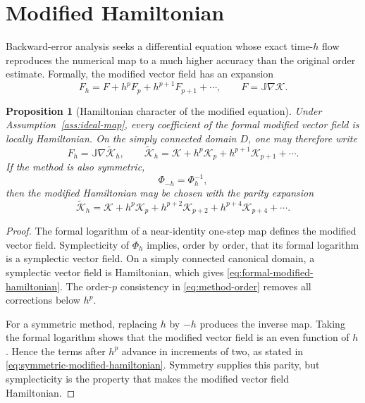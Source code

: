 \documentclass[11pt,a4paper]{article}
\newtheorem{proposition}[theorem]{Proposition}
\theoremstyle{definition}
\theoremstyle{remark}
\newcommand{\J}{\mathbb{J}}
\newcommand{\K}{\mathcal{K}}
\newcommand{\Kh}{\widetilde{\mathcal{K}}_h}
\newcommand{\PhiNum}{\Phi_h}
\begin{document}
\section{Modified Hamiltonian}

Backward-error analysis seeks a differential equation whose exact time-$h$
flow reproduces the numerical map to a much higher accuracy than the original
order estimate.  Formally, the modified vector field has an expansion
\begin{equation}
 F_h=F+h^pF_p+h^{p+1}F_{p+1}+\cdots,
 \qquad
 F=\J\nabla\K.
 \label{eq:formal-modified-vector-field}
\end{equation}

\begin{proposition}[Hamiltonian character of the modified equation]
\label{prop:modified-hamiltonian}
Under Assumption~\ref{ass:ideal-map}, every coefficient of the formal modified
vector field is locally Hamiltonian.  On the simply connected domain $D$, one
may therefore write
\begin{equation}
 F_h=\J\nabla\Kh,
 \qquad
 \Kh
 =\K+h^p\K_p+h^{p+1}\K_{p+1}+\cdots.
 \label{eq:formal-modified-hamiltonian}
\end{equation}
If the method is also symmetric,
\begin{equation}
 \Phi_{-h}=\PhiNum^{-1},
 \label{eq:symmetry-condition}
\end{equation}
then the modified Hamiltonian may be chosen with the parity expansion
\begin{equation}
 \Kh=\K+h^p\K_p+h^{p+2}\K_{p+2}+h^{p+4}\K_{p+4}+\cdots.
 \label{eq:symmetric-modified-hamiltonian}
\end{equation}
\end{proposition}

\begin{proof}
The formal logarithm of a near-identity one-step map defines the modified
vector field.  Symplecticity of $\PhiNum$ implies, order by order, that its
formal logarithm is a symplectic vector field.  On a simply connected canonical
domain, a symplectic vector field is Hamiltonian, which gives
\eqref{eq:formal-modified-hamiltonian}.  The order-$p$ consistency in
\eqref{eq:method-order} removes all corrections below $h^p$.

For a symmetric method, replacing $h$ by $-h$ produces the inverse map.
Taking the formal logarithm shows that the modified vector field is an even
function of $h$.  Hence the terms after $h^p$ advance in increments of two,
as stated in \eqref{eq:symmetric-modified-hamiltonian}.  Symmetry supplies this
parity, but symplecticity is the property that makes the modified vector field
Hamiltonian.
\end{proof}
\end{document}
